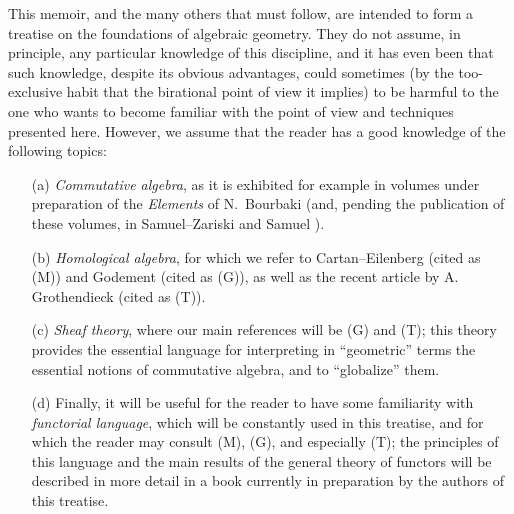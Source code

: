 This memoir, and the many others that must follow, are intended to form a
treatise on the foundations of algebraic geometry. They do not assume, in
principle, any particular knowledge of this discipline, and it has even been
that such knowledge, despite its obvious advantages, could sometimes (by the
too-exclusive habit that the birational point of view it implies) to be harmful
to the one who wants to become familiar with the point of view and techniques
presented here. However, we assume that the reader has a good knowledge of the
following topics:
\begin{itemize}
  \item[(a)] {\it Commutative algebra}, as it is exhibited for example in
             volumes under preparation of the {\it Elements} of N.~Bourbaki
             (and, pending the publication of these volumes, in Samuel--Zariski
             \cite{I-13} and Samuel \cite{I-11,I-12}).
  \item[(b)] {\it Homological algebra}, for which we refer to Cartan--Eilenberg
             \cite{I-2} (cited as (M)) and Godement \cite{I-4} (cited as (G)), as well
             as the recent article by A. Grothendieck \cite{I-6} (cited as (T)).
  \item[(c)] {\it Sheaf theory}, where our main references will be (G) and (T);
             this theory provides the essential language for interpreting in
             ``geometric'' terms the essential notions of commutative algebra,
             and to ``globalize'' them.
  \item[(d)] Finally, it will be useful for the reader to have some familiarity with
             {\it functorial language}, which will be constantly used in this
             treatise, and for which the reader may consult (M), (G), and especially
             (T); the principles of this language and the main results of the general
             theory of functors will be described in more detail in a book currently
             in preparation by the authors of this treatise.
\end{itemize}

\sectionbreak

